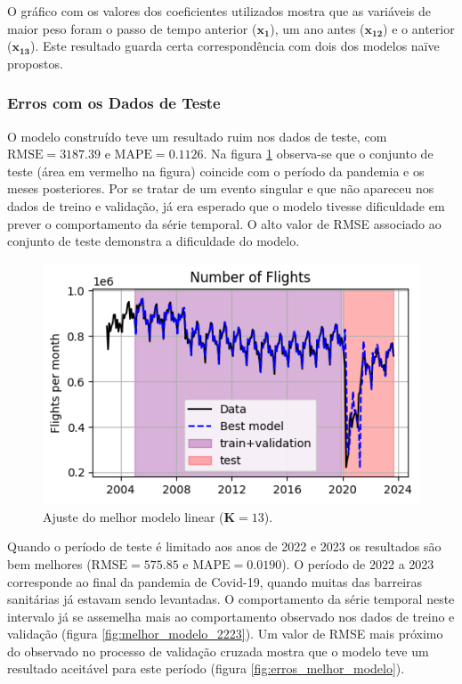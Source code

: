 \documentclass[final,5p]{elsarticle}
\numberwithin{equation}{section}
\begin{document}
    O gráfico com os valores dos coeficientes utilizados mostra que as variáveis de maior peso foram o passo de tempo anterior ($\textbf{x}_{\textbf{1}}$), um ano antes ($\textbf{x}_{\textbf{12}}$) e o anterior ($\textbf{x}_{\textbf{13}}$). Este resultado guarda certa correspondência com dois dos modelos naïve propostos.

    \subsubsection{Erros com os Dados de Teste}

    O modelo construído teve um resultado ruim nos dados de teste, com $\text{RMSE} = 3187.39$ e $\text{MAPE} = 0.1126$. Na figura \ref{fig:melhor_modelo_teste} observa-se que o conjunto de teste (área em vermelho na figura) coincide com o período da pandemia e os meses posteriores. Por se tratar de um evento singular e que não apareceu nos dados de treino e validação, já era esperado que o modelo tivesse dificuldade em prever o comportamento da série temporal. O alto valor de RMSE associado ao conjunto de teste demonstra a dificuldade do modelo.

    \begin{figure}[hbt!]
        \includegraphics[width=0.95\columnwidth]{B2_BestModelFit.png}
        \caption{Ajuste do melhor modelo linear ($\textbf{K} = 13$).}
        \label{fig:melhor_modelo_teste}
    \end{figure}

    Quando o período de teste é limitado aos anos de 2022 e 2023 os resultados são bem melhores ($\text{RMSE} = 575.85$ e $\text{MAPE} = 0.0190$). O período de 2022 a 2023 corresponde ao final da pandemia de Covid-19, quando muitas das barreiras sanitárias já estavam sendo levantadas. O comportamento da série temporal neste intervalo já se assemelha mais ao comportamento observado nos dados de treino e validação (figura \ref{fig:melhor_modelo_2223}). Um valor de RMSE mais próximo do observado no processo de validação cruzada mostra que o modelo teve um resultado aceitável para este período (figura \ref{fig:erros_melhor_modelo}).
\end{document}
